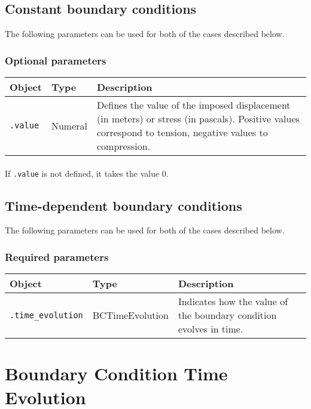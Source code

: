 \documentclass[10pt]{article}
\begin{document}
\subsection{Constant boundary conditions}

The following parameters can be used for both of the cases described below.

\subsubsection*{Optional parameters}

\begin{tabularx}{\textwidth}{llX}
\hline 
Object & Type & Description \\ 
\hline 
\verb+.value+ & Numeral & Defines the value of the imposed displacement (in meters) or stress (in pascals). Positive values correspond to tension, negative values to compression.\\ 
\hline 
\end{tabularx}

\paragraph{} If \verb+.value+ is not defined, it takes the value 0.

\subsection{Time-dependent boundary conditions}

The following parameters can be used for both of the cases described below.

\subsubsection*{Required parameters}

\begin{tabularx}{\textwidth}{llX}
\hline 
Object & Type & Description \\ 
\hline 
\verb+.time_evolution+ & BCTimeEvolution & Indicates how the value of the boundary condition evolves in time.\\
\hline 
\end{tabularx}

\section{Boundary Condition Time Evolution}
\end{document}
